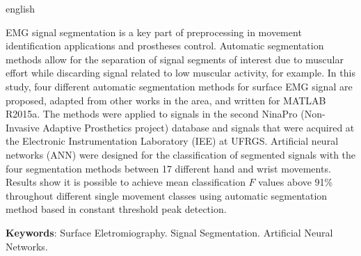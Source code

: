 \begin{resumo}[Abstract]
 \begin{otherlanguage*}{english}
	
	EMG signal segmentation is a key part of preprocessing in movement identification applications and prostheses control. Automatic segmentation methods allow for the separation of signal segments of interest due to muscular effort while discarding signal related to low muscular activity, for example. In this study, four different automatic segmentation methods for surface EMG signal are proposed, adapted from other works in the area, and written for MATLAB R2015a. The methods were applied to signals in the second NinaPro (Non-Invasive Adaptive Prosthetics project) database and signals that were acquired at the Electronic Instrumentation Laboratory (IEE) at UFRGS. Artificial neural networks (ANN) were designed for the classification of segmented signals with the four segmentation methods between 17 different hand and wrist movements. Results show it is possible to achieve mean classification $F$ values above 91\% throughout different single movement classes using automatic segmentation method based in constant threshold peak detection.
	
   \vspace{\onelineskip}
   \noindent 
   \textbf{Keywords}: Surface Eletromiography. Signal Segmentation. Artificial Neural Networks.
 \end{otherlanguage*}
\end{resumo}


\listoffigures*
\cleardoublepage

\listoftables*
\cleardoublepage


